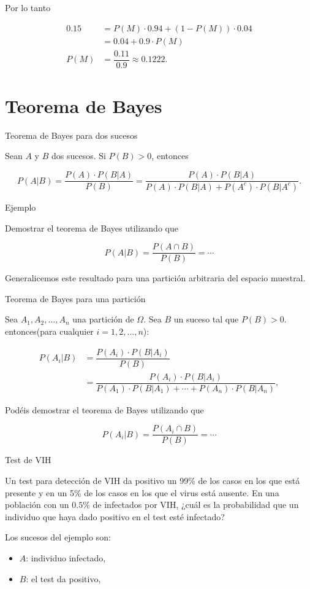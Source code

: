 \documentclass[
  letterpaper,
  DIV=11,
  numbers=noendperiod]{scrreprt}
\providecommand{\tightlist}{%
  \setlength{\itemsep}{0pt}\setlength{\parskip}{0pt}}\usepackage{longtable,booktabs,array}
\begin{document}
Por lo tanto

\[
\begin{array}{rl}
0.15 & = P(M)\cdot 0.94+(1-P(M))\cdot 0.04\\
 & =0.04+0.9\cdot P(M)\\
P(M) & =\dfrac{0.11}{0.9}\approx 0.1222.
\end{array}
\]

\chapter{Teorema de Bayes}\label{teorema-de-bayes}

Teorema de Bayes para dos sucesos

Sean \(A\) y \(B\) dos sucesos. Si \(P(B)>0\), entonces

\[
P(A|B) =\dfrac{P(A)\cdot P(B|A)}{P(B)}=\dfrac{P(A)\cdot P(B|A)}{P(A)\cdot P(B|A)+P(A^c)\cdot P(B|A^c)}.
\]

Ejemplo

Demostrar el teorema de Bayes utilizando que

\[P(A|B) =\dfrac{P(A\cap B)}{P(B)}=\cdots\]

Generalicemos este resultado para una partición arbitraria del espacio
muestral.

Teorema de Bayes para una partición

Sea \(A_1,A_2,\ldots,A_n\) una partición de \(\Omega\). Sea \(B\) un
suceso tal que \(P(B)>0\). entonces(para cualquier \(i=1,2,\ldots,n\)):

\[
\begin{array}{rl}
P(A_i|B) & =\dfrac{P(A_i)\cdot P(B|A_i)}{P(B)}\\
& =\dfrac{P(A_i)\cdot P(B|A_i)}{P(A_1)\cdot P(B|A_1)+\cdots+P(A_n)\cdot P(B|A_n)},
\end{array}
\]

Podéis demostrar el teorema de Bayes utilizando que

\[P(A_i|B) =\dfrac{P(A_i\cap B)}{P(B)}=\cdots\]

Test de VIH

Un test para detección de VIH da positivo un 99\% de los casos en los
que está presente y en un 5\% de los casos en los que el virus está
ausente. En una población con un \(0.5\%\) de infectados por VIH, ¿cuál
es la probabilidad que un individuo que haya dado positivo en el test
esté infectado?

Los sucesos del ejemplo son:

\begin{itemize}
\tightlist
\item
  \(A\): individuo infectado,
\item
  \(B\): el test da positivo,
\end{itemize}
\end{document}
